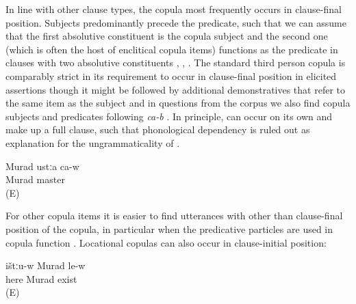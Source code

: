 In line with other clause types, the copula most frequently occurs in clause-final position. Subjects predominantly precede the predicate, such that we can assume that the first absolutive constituent is the copula subject and the second one (which is often the host of enclitical copula items) functions as the predicate in clauses with two absolutive constituents , , . The standard third person copula  is comparably strict in its requirement to occur in clause-final position in elicited assertions  though it might be followed by additional demonstratives that refer to the same item as the subject and in questions from the corpus we also find copula subjects and predicates following \textit{ca-b} . In principle,  can occur on its own and make up a full clause, such that phonological dependency is ruled out as explanation for the ungrammaticality of . 


\begin{exe}
	\ex	\label{ex:Murad is a / the master}
	\begin{xlist}
		\ex	\label{ex:Murad is a / the master@A}
		\gll	Murad	ustːa ca-w\\
			Murad master \\
		\glt	{} (E)
	
		 \label{ex:Murad is a / the master@B}
		 \label{ex:Murad is a / the master@C}
	\end{xlist}
\end{exe}

For other copula items it is easier to find utterances with other than clause-final position of the copula, in particular when the predicative particles are used in copula function . Locational copulas can also occur in clause-initial position:
%
\begin{exe}
	\ex	\label{ex:Murad is here}
	\begin{xlist}
		\ex	\label{ex:Murad is here@A}
		\gll	ištːu-w	Murad	le-w\\
			here	Murad	exist\tsc{-m}\\
		\glt	\sqt{Murad is here.} (E)
	
		\ex	{}	\label{ex:Murad is here@B}
	\end{xlist}
\end{exe}

